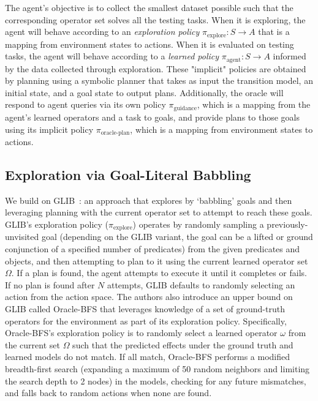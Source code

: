 The agent's objective is to collect the smallest dataset possible such that the corresponding operator set solves all the testing tasks. 
When it is exploring, the agent will behave according to an \textit{exploration policy} $\pi_{\text{explore}}: S \rightarrow A$ that is a mapping from environment states to actions. When it is evaluated on testing tasks, the agent will behave according to a \textit{learned policy} $\pi_{\text{agent}}: S \rightarrow A$ informed by the data collected through exploration. These "implicit" policies are obtained by planning using a symbolic planner that takes as input the transition model, an initial state, and a goal state to output plans. 
Additionally, the oracle will respond to agent queries via its own policy $\pi_{\text{guidance}}$, which is a mapping from the agent's learned operators and a task to goals, and provide plans to those goals using its implicit policy $\pi_{\text{oracle-plan}}$, which is a mapping from environment states to actions.

\subsection{Exploration via Goal-Literal Babbling}
\label{subsec:glib-background}
We build on GLIB~\citep{glib}: an approach that explores by `babbling' goals and then leveraging planning with the current operator set to attempt to reach these goals.
GLIB's exploration policy ($\pi_{\text{explore}}$) operates by randomly sampling a previously-unvisited goal (depending on the GLIB variant, the goal can be a lifted or ground conjunction of a specified number of predicates) from the given predicates and objects, and then attempting to plan to it using the current learned operator set $\Omega$.
If a plan is found, the agent attempts to execute it until it completes or fails. 
If no plan is found after $N$ attempts, GLIB defaults to randomly selecting an action from the action space.
The authors also introduce an upper bound on GLIB called Oracle-BFS that leverages knowledge of a set of ground-truth operators for the environment as part of its exploration policy.
Specifically, Oracle-BFS's exploration policy is to randomly select a learned operator $\omega$ from the current set $\Omega$ such that the predicted effects under the ground truth and learned models do not match. If all match, Oracle-BFS performs a modified breadth-first search (expanding a maximum of 50 random neighbors and limiting the search depth to 2 nodes) in the models, checking for any future mismatches, and falls back to random actions when none are found. 
 
